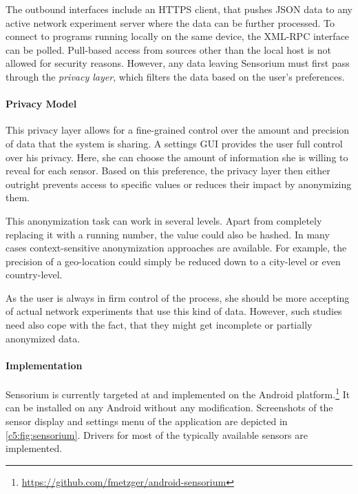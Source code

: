 The outbound interfaces include an \gls{HTTPS} client, that pushes \acrshort{JSON} data to any active network experiment server where the data can be further processed. To connect to programs running locally on the same device, the \acrshort{XML}-\acrshort{RPC} interface can be polled. Pull-based access from sources other than the local host is not allowed for security reasons. However, any data leaving Sensorium must first pass through the \textit{privacy layer}, which filters the data based on the user's preferences.


\paragraph{Privacy Model}

This privacy layer allows for a fine-grained control over the amount and precision of data that the system is sharing. A settings \gls{GUI} provides the user full control over his privacy. Here, she can choose the amount of information she is willing to reveal for each sensor. Based on this preference, the privacy layer then either outright prevents access to specific values or reduces their impact by anonymizing them.

This anonymization task can work in several levels. Apart from completely replacing it with a running number, the value could also be hashed. In many cases context-sensitive anonymization approaches are available. For example, the precision of a geo-location could simply be reduced down to a city-level or even country-level.

As the user is always in firm control of the process, she should be more accepting of actual network experiments that use this kind of data. However, such studies need also cope with the fact, that they might get incomplete or partially anonymized data.


\paragraph{Implementation}

Sensorium is currently targeted at and implemented on the Android platform.\footnote{\url{https://github.com/fmetzger/android-sensorium}} It can be installed on any Android without any modification. Screenshots of the sensor display and settings menu of the application are depicted in \ref{c5:fig:sensorium}. Drivers for most of the typically available sensors are implemented.

